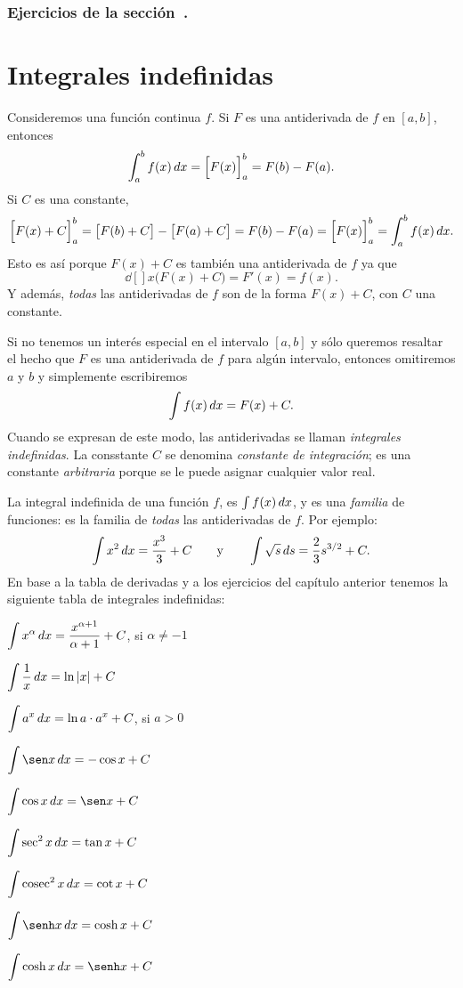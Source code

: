 \subsubsection*{Ejercicios de la sección~.}

\begin{enumerate}
  
\end{enumerate}  


\section{Integrales indefinidas}

Consideremos una función continua $f$. Si $F$ es una antiderivada de $f$ en $[a,b]$, entonces
\[
\int_a^b f(x)\,dx = \Big[F(x)\Big]_a^b = F(b)-F(a).
\]
Si $C$ es una constante, 
\[
  \Big[F(x)+C\Big]_a^b 
  = \big[F(b)+C\big]-\big[F(a)+C\big]= F(b)-F(a)
  = \Big[F(x)\Big]_a^b = \int_a^b f(x)\,dx.
\]
Esto es así porque $F(x)+C$ es también una antiderivada de $f$ ya que
\[
\dd[]{}{x} \big(F(x)+C\big) = F'(x) = f(x).
\]
Y además, \emph{todas} las antiderivadas de $f$ son de la forma $F(x)+C$, con $C$ una constante.

Si no tenemos un interés especial en el intervalo $[a,b]$ y sólo queremos resaltar el hecho que $F$ es una antiderivada de $f$ para algún intervalo, entonces omitiremos $a$ y $b$ y simplemente escribiremos
\[
\int f(x)\,dx = F(x)+C.
\]
Cuando se expresan de este modo, las antiderivadas se llaman \emph{integrales indefinidas}.
La consstante $C$ se denomina \emph{constante de integración}; es una constante \emph{arbitraria} porque se le puede asignar cualquier valor real.

La integral indefinida de una función $f$, es $\int f(x)\,dx$, y es una \emph{familia} de funciones: es la familia de \emph{todas} las antiderivadas de $f$. Por ejemplo:
\[
\int x^2\,dx = \frac{x^3}{3} + C 
\qquad\text y \qquad
\int \sqrt{s}\,ds = \frac23 s^{3/2}+C.
\]
En base a la tabla de derivadas y a los ejercicios del capítulo anterior tenemos la siguiente tabla de integrales indefinidas:

\begin{multicols}{2}
  $\displaystyle \int x^\alpha \,dx = \frac{x^{\alpha+1}}{\alpha+1} + C$, si $\alpha\neq -1$
  
  $\displaystyle \int \frac1x\,dx = \ln|x| + C$
  
  $\displaystyle \int a^x \,dx = \ln a\cdot a^x  + C$, si $a>0$
  
  $\D \int \sen x\dx = -\cos x + C$
  
  $\D \int \cos x \dx = \sen x + C$
  
  $\displaystyle \int \sec^2 x\,dx = \tan x + C$
  
  $\displaystyle \int \operatorname{cosec}^2 x\,dx = \cot x + C$
  
  $\D \int \senh x \dx = \cosh x + C$
  
  $\D \int \cosh x \dx = \senh x + C$
  
\end{multicols}

